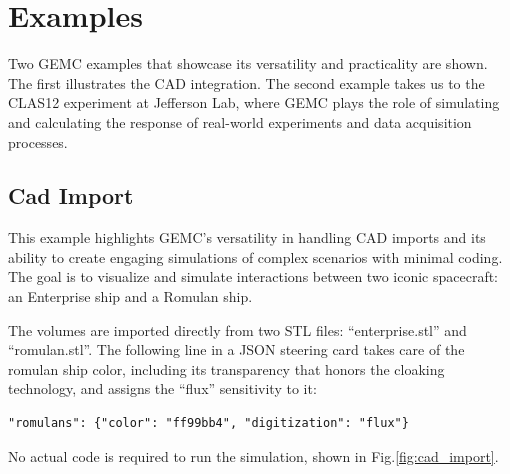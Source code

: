 \section{Examples}
\label{sec:examples}

Two GEMC examples that showcase its versatility and practicality are shown.
The first illustrates the CAD integration.
The second example takes us to the CLAS12 experiment at Jefferson Lab, where GEMC plays the role
of simulating and calculating the response of real-world experiments and data acquisition processes.


\subsection{Cad Import}
\label{subsec:cad_import}

This example highlights GEMC's versatility in handling CAD imports and its ability to create engaging
simulations of complex scenarios with minimal coding.
The goal is to visualize and simulate interactions between two iconic spacecraft: an Enterprise ship and a Romulan ship.

The volumes are imported directly from two STL
files: ``enterprise.stl'' and ``romulan.stl''.
The following line in a JSON steering card takes care of the romulan ship color, including its transparency that honors the cloaking technology,
and assigns the ``flux'' sensitivity to it:

\begin{verbatim}
"romulans": {"color": "ff99bb4", "digitization": "flux"}
\end{verbatim}


No actual code is required to run the simulation,  shown in Fig.\ref{fig:cad_import}.



